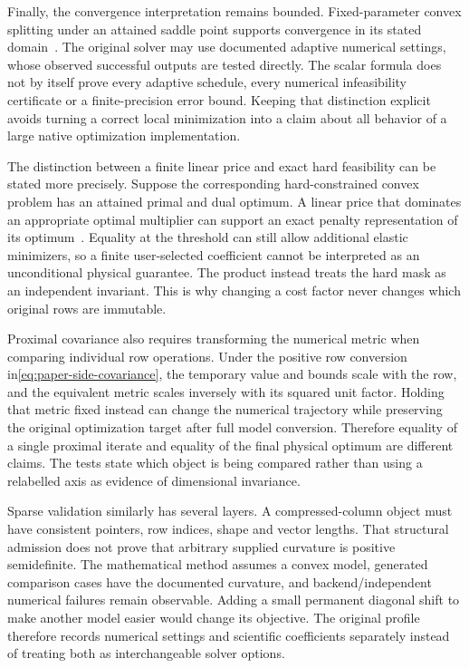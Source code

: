Finally, the convergence interpretation remains bounded. Fixed-parameter
convex splitting under an attained saddle point supports convergence in
its stated domain~\cite{eckstein,admm}. The original solver may use
documented adaptive numerical settings, whose observed successful outputs
are tested directly. The scalar formula does not by itself prove every
adaptive schedule, every numerical infeasibility certificate or a
finite-precision error bound. Keeping that distinction explicit avoids
turning a correct local minimization into a claim about all behavior of
a large native optimization implementation.

The distinction between a finite linear price and exact hard feasibility
can be stated more precisely. Suppose the corresponding hard-constrained
convex problem has an attained primal and dual optimum. A linear price that
dominates an appropriate optimal multiplier can support an exact penalty
representation of its optimum~\cite{kerrigan}. Equality at the threshold
can still allow additional elastic minimizers, so a finite user-selected
coefficient cannot be interpreted as an unconditional physical guarantee.
The product instead treats the hard mask as an independent invariant.
This is why changing a cost factor never changes which original rows
are immutable.

Proximal covariance also requires transforming the numerical metric when
comparing individual row operations. Under the positive row conversion
in\eqref{eq:paper-side-covariance}, the temporary value and bounds scale
with the row, and the equivalent metric scales inversely with its squared
unit factor. Holding that metric fixed instead can change the numerical
trajectory while preserving the original optimization target after full
model conversion. Therefore equality of a single proximal iterate and
equality of the final physical optimum are different claims. The tests
state which object is being compared rather than using a relabelled axis
as evidence of dimensional invariance.

Sparse validation similarly has several layers. A compressed-column
object must have consistent pointers, row indices, shape and vector
lengths. That structural admission does not prove that arbitrary supplied
curvature is positive semidefinite. The mathematical method assumes a
convex model, generated comparison cases have the documented curvature,
and backend/independent numerical failures remain observable. Adding a
small permanent diagonal shift to make another model easier would change
its objective. The original profile therefore records numerical settings
and scientific coefficients separately instead of treating both as
interchangeable solver options.

